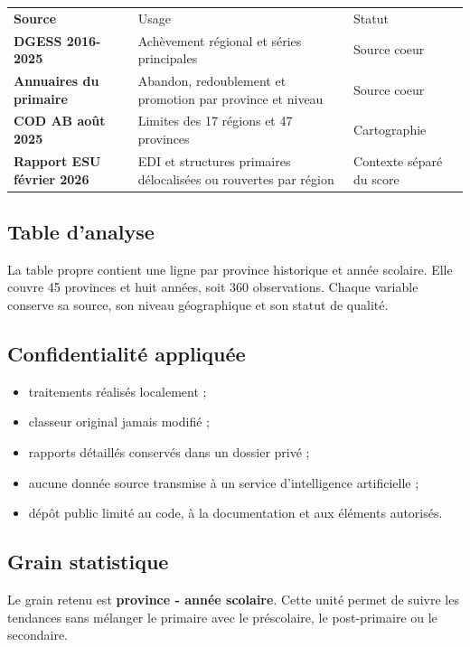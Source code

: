\documentclass[12pt,a4paper]{article}
\begin{document}
\begin{tabularx}{\textwidth}{>{\bfseries}p{3.5cm} X p{3.1cm}}
\rowcolor{Navy}\color{white}Source & \color{white}Usage & \color{white}Statut\\
DGESS 2016-2025 & Achèvement régional et séries principales & Source coeur\\
Annuaires du primaire & Abandon, redoublement et promotion par province et niveau & Source coeur\\
COD AB août 2025 & Limites des 17 régions et 47 provinces & Cartographie\\
Rapport ESU février 2026 & EDI et structures primaires délocalisées ou rouvertes par région & Contexte séparé du score\\
\end{tabularx}

\subsection{Table d'analyse}
La table propre contient une ligne par province historique et année scolaire. Elle couvre 45 provinces et huit années, soit 360 observations. Chaque variable conserve sa source, son niveau géographique et son statut de qualité.

\subsection{Confidentialité appliquée}
\begin{itemize}
  \item traitements réalisés localement ;
  \item classeur original jamais modifié ;
  \item rapports détaillés conservés dans un dossier privé ;
  \item aucune donnée source transmise à un service d'intelligence artificielle ;
  \item dépôt public limité au code, à la documentation et aux éléments autorisés.
\end{itemize}

\subsection{Grain statistique}
Le grain retenu est \textbf{province - année scolaire}. Cette unité permet de suivre les tendances sans mélanger le primaire avec le préscolaire, le post-primaire ou le secondaire.
\clearpage
\thispagestyle{fancy}
\end{document}
